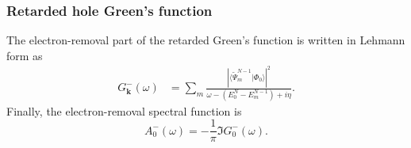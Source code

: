 \subsubsection{Retarded hole Green's function}
The electron-removal part of the retarded Green's function is written
in Lehmann form as
\begin{align}
    G_{\bm{k}}^{-}(\omega)
    &=
    \sum_m
    \frac{
    \left|
    \langle
    \widetilde{\Psi}_m^{N-1}
    |
   \Phi_0
    \rangle
    \right|^2
    }{
    \omega
    -
    \left(
    E_0^N-E_m^{N-1}
    \right)
    +
    i\eta
    }.
    \label{eq:lehmann}
\end{align}
Finally, the electron-removal spectral function is
\begin{equation}
    {
    A_0^{-}(\omega)
    =
    -\frac{1}{\pi}
    \Im G_0^{-}(\omega).
    }
\end{equation}
